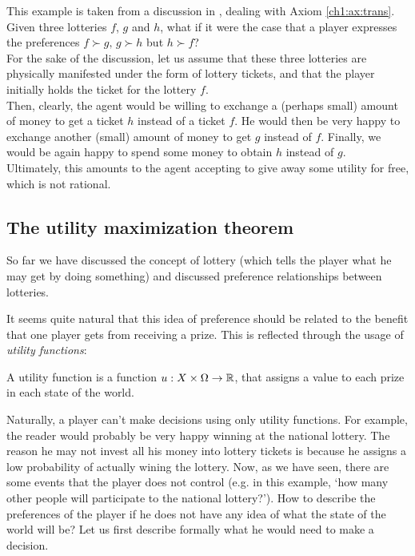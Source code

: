 \begin{example}
\label{ch1:otherExa}
This example is taken from a discussion in \cite[Chapter 3]{ShLeMSAG}, dealing with Axiom \ref{ch1:ax:trans}.
Given three lotteries $f$, $g$ and $h$, what if it were the case that a player expresses the preferences $f \succ g, \, g \succ h$ but $h \succ f$? \\
For the sake of the discussion, let us assume that these three lotteries are physically manifested under the form of lottery tickets, and that the player initially holds the ticket for the lottery $f$. \\
Then, clearly, the agent would be willing to exchange a (perhaps small) amount of money to get a ticket $h$ instead of a ticket $f$. He would then be very happy to exchange another (small) amount of money to get $g$ instead of $f$. Finally, we would be again happy to spend some money to obtain $h$ instead of $g$.\\
Ultimately, this amounts to the agent accepting to give away some utility for free, which is not rational.

\end{example}

\subsection{The utility maximization theorem}

So far we have discussed the concept of lottery (which tells the player what he may get by doing something) and discussed preference relationships between lotteries.

It seems quite natural that this idea of preference should be related to the benefit that one player gets from receiving a prize. This is reflected through the usage of \emph{utility functions}:

\begin{definition}
A utility function is a function $u : X \times \Omega \rightarrow \mathbb{R}$, that assigns a value to each prize in each state of the world.
\end{definition}

Naturally, a player can't make decisions using only utility functions. For example, the reader would probably be very happy winning at the national lottery.
The reason he may not invest all his money into lottery tickets is because he assigns a low probability of actually wining the lottery.
Now, as we have seen, there are some events that the player does not control (e.g. in this example, `how many other people will participate to the national lottery?').
How to describe the preferences of the player if he does not have any idea of what the state of the world will be?
Let us first describe formally what he would need to make a decision.

